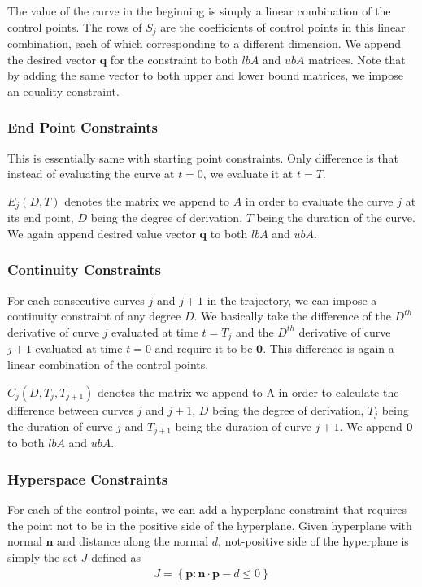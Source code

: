 \documentclass{svproc}
\newcommand{\vp}{\mathbf{p}}
\newcommand{\vq}{\mathbf{q}}
\newcommand{\vzero}{\mathbf{0}}
\newcommand{\vn}{\mathbf{n}}
\begin{document}
The value of the curve in the beginning is simply a linear combination of the control points. The rows of $S_j$ are the coefficients of control points in this linear combination, each of which corresponding to a different dimension. We append the desired vector $\vq$ for the constraint to both $lbA$ and $ubA$ matrices. Note that by adding the same vector to both upper and lower bound matrices, we impose an equality constraint.
\subsubsection{End Point Constraints}
This is essentially same with starting point constraints. Only difference is that instead of evaluating the curve at $t=0$, we evaluate it at $t=T$.

$E_j(D,T)$ denotes the matrix we append to $A$ in order to evaluate the curve $j$ at its end point, $D$ being the degree of derivation, $T$ being the duration of the curve. We again append desired value vector $\vq$ to both $lbA$ and $ubA$.
\subsubsection{Continuity Constraints}
For each consecutive curves $j$ and $j+1$ in the trajectory, we can impose a continuity constraint of any degree $D$. We basically take the difference of the $D^{th}$ derivative of curve $j$ evaluated at time $t=T_j$ and the $D^{th}$ derivative of curve $j+1$ evaluated at time $t=0$ and require it to be $\vzero$. This difference is again a linear combination of the control points.

$C_j(D,T_j,T_{j+1})$ denotes the matrix we append to A in order to calculate the difference between curves $j$ and $j+1$, $D$ being the degree of derivation, $T_j$ being the duration of curve $j$ and $T_{j+1}$ being the duration of curve $j+1$. We append $\vzero$ to both $lbA$ and $ubA$.
\subsubsection{Hyperspace Constraints}
For each of the control points, we can add a hyperplane constraint that requires the point not to be in the positive side of the hyperplane. Given hyperplane with normal $\vn$ and distance along the normal $d$, not-positive side of the hyperplane is simply the set $J$ defined as
\begin{align*}
    J = \left\{\vp: \vn \cdot \vp - d \leq 0\right\}
\end{align*}
\end{document}
